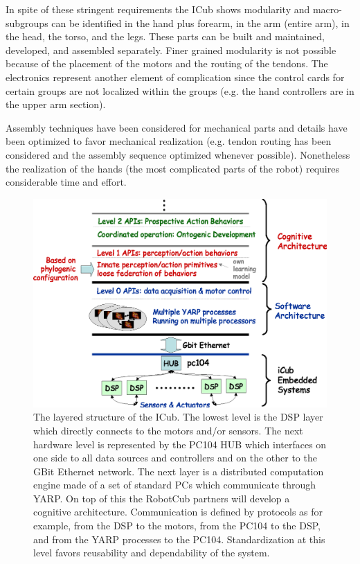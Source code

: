 In spite of these stringent requirements the ICub shows modularity and macro-subgroups
can be identified in the hand plus forearm, in the arm (entire arm), in the head, the torso,
and the legs. These parts can be built and maintained, developed, and assembled 
separately. Finer grained modularity is not possible because of the placement of the
motors and the routing of the tendons. The electronics represent another element of
complication since the control cards for certain groups are not localized within the 
groups (e.g. the hand controllers are in the upper arm section).

Assembly techniques have been considered for mechanical parts and details have been
optimized to favor mechanical realization (e.g. tendon routing has been considered and
the assembly sequence optimized whenever possible). Nonetheless the realization 
of the hands (the most complicated parts of the robot) requires considerable time 
and effort.

\begin{figure}[tbp]
\centerline{
\includegraphics[width=15cm]{layers}
}
\caption{The layered structure of the ICub. The lowest level is the DSP layer which 
directly connects to the motors and/or sensors. The next hardware level is represented
by the PC104 HUB which interfaces on one side to all data sources and controllers and
on the other to the GBit Ethernet network. The next layer is a distributed computation
engine made of a set of standard PCs which communicate through YARP. On top of this
the RobotCub partners will develop a cognitive architecture. Communication is defined by
protocols as for example, from the DSP to the motors, from the PC104 to the DSP, and from
the YARP processes to the PC104. Standardization at this level favors reusability and
dependability of the system.} 
\label{fig:layers}
\end{figure}

